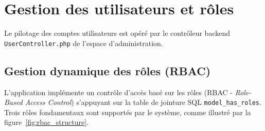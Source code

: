 \section{Gestion des utilisateurs et rôles}

Le pilotage des comptes utilisateurs est opéré par le contrôleur backend \texttt{UserController.php} de l'espace d'administration.

\subsection{Gestion dynamique des rôles (RBAC)}

L'application implémente un contrôle d'accès basé sur les rôles (RBAC - \textit{Role-Based Access Control}) s'appuyant sur la table de jointure SQL \texttt{model_has_roles}. Trois rôles fondamentaux sont supportés par le système, comme illustré par la figure~\ref{fig:rbac_structure}.

